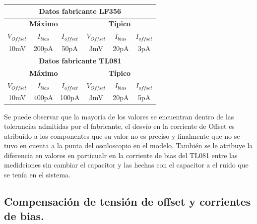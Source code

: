 \begin{table}[H]
\begin{center}
\begin{tabular}{|c|c|c|c|c|c|}
\hline
\multicolumn{6}{|c|}{\textbf{Datos fabricante LF356}}                                                                                     \\ \hline
\multicolumn{3}{|c|}{\textbf{Máximo}}                               & \multicolumn{3}{c|}{\textbf{Típico}}                                \\ \hline
\textbf{$V_{Offset}$} & \textbf{$I_{bias}$} & \textbf{$I_{offset}$} & \textbf{$V_{Offset}$} & \textbf{$I_{bias}$} & \textbf{$I_{offset}$} \\ \hline
10mV                  & 200pA               & 50pA                  & 3mV                   & 20pA                & 3pA                   \\ \hline
\multicolumn{6}{|c|}{\textbf{Datos fabricante TL081}}                                                                                     \\ \hline
\multicolumn{3}{|c|}{\textbf{Máximo}}                               & \multicolumn{3}{c|}{\textbf{Típico}}                                \\ \hline
\textbf{$V_{Offset}$} & \textbf{$I_{bias}$} & \textbf{$I_{offset}$} & \textbf{$V_{Offset}$} & \textbf{$I_{bias}$} & \textbf{$I_{offset}$} \\ \hline
10mV                  & 400pA               & 100pA                 & 3mV                   & 20pA                & 5pA                   \\ \hline
\end{tabular}
\end{center}
\end{table}
Se puede observar que la mayoría de los valores se encuentran dentro de las tolerancias admitidas por el fabricante, el desvío en la corriente de Offset es atribuído a los componentes que su valor no es preciso y finalmente que no se tuvo en cuenta a la punta del osciloscopio en el modelo.
También se le atribuye la diferencia en valores en particualr en la corriente  de bias del TL081 entre las medidciones sin cambiar el capacitor y las hechas con el capacitor a el ruido que se tenía en el sistema.

\subsection{Compensación de tensión de offset y corrientes de bias.}
